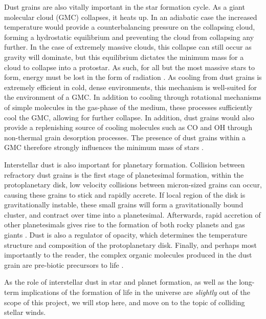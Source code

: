 Dust grains are also vitally important in the star formation cycle.
As a giant molecular cloud (GMC) collapses, it heats up.
In an adiabatic case the increased temperature would provide a counterbalancing pressure on the collapsing cloud, forming a hydrostatic equilibrium and preventing the cloud from collapsing any further.
In the case of extremely massive clouds, this collapse can still occur as gravity will dominate, but this equilibrium dictates the minimum mass for a cloud to collapse into a protostar.
As such, for all but the most massive stars to form, energy must be lost in the form of radiation
\parencite{ward-thompsonIntroductionStarFormation2011}.
As cooling from dust grains is extremely efficient in cold, dense environments, this mechanism is well-suited for the environment of a GMC.
In addition to cooling through rotational mechanisms of simple molecules in the gas-phase of the medium, these processes sufficiently cool the GMC, allowing for further collapse.
In addition, dust grains would also provide a replenishing source of cooling molecules such as CO and OH through non-thermal grain desorption processes.
The presence of dust grains within a GMC therefore strongly influences the minimum mass of stars
\parencite{williamsChemistryCosmicDust2015}.

Interstellar dust is also important for planetary formation.
Collision between refractory dust grains is the first stage of planetesimal formation, within the protoplanetary disk, low velocity collisions between micron-sized grains can occur, causing these grains to stick and rapidly accrete.
If local region of the disk is gravitationally instable, these small grains will form a gravitationally bound cluster, and contract over time into a planetesimal.
Afterwards, rapid accretion of other planetesimals gives rise to the formation of both rocky planets and gas giants
\parencite{apaiProtoplanetaryDustAstrophysical2010}.
Dust is also a regulator of opacity, which determines the temperature structure and composition of the protoplanetary disk.
Finally, and perhaps most importantly to the reader, the complex organic molecules produced in the dust grain are pre-biotic precursors to life
\parencite{birnstielDustEvolutionFormation2016}.

As the role of interstellar dust in star and planet formation, as well as the long-term implications of the formation of life in the universe are \textit{slightly} out of the scope of this project, we will stop here, and move on to the topic of colliding stellar winds.

